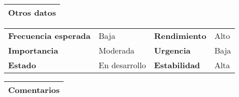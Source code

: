 \documentclass[11pt,a4paper]{article}
\begin{document}
\begin{table}[H]
	\begin{tabularx}{\textwidth}{X}
		\textbf{Otros datos}\\ \hline
	\end{tabularx}
	
	\begin{tabularx}{\textwidth}{lXlX}
		\textbf{Frecuencia esperada} & Baja & \textbf{Rendimiento} & Alto\\
		\textbf{Importancia} & Moderada & \textbf{Urgencia} & Baja\\
		\textbf{Estado} & En desarrollo & \textbf{Estabilidad} & Alta\\
	\end{tabularx}
	
	\begin{tabularx}{\textwidth}{X}
		\textbf{Comentarios}\\ \hline
	\end{tabularx}
\end{table}

\newpage


\end{document}
